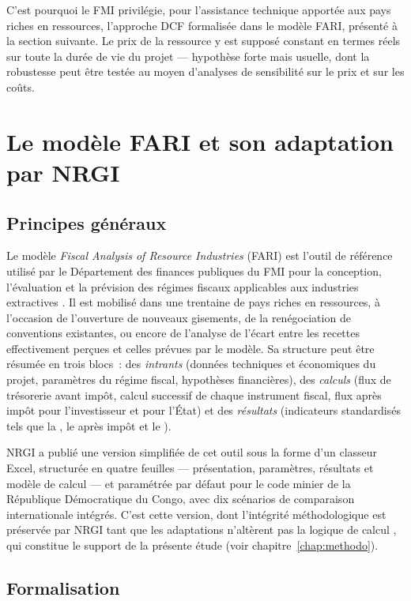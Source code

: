 C'est pourquoi le FMI privilégie, pour l'assistance technique apportée aux pays riches en ressources, l'approche DCF formalisée dans le modèle FARI, présenté à la section suivante. Le prix de la ressource y est supposé constant en termes réels sur toute la durée de vie du projet --- hypothèse forte mais usuelle, dont la robustesse peut être testée au moyen d'analyses de sensibilité sur le prix et sur les coûts.

\section{Le modèle FARI et son adaptation par NRGI}
\label{sec:fari}

\subsection{Principes généraux}

Le modèle \emph{Fiscal Analysis of Resource Industries} (FARI) est l'outil de référence utilisé par le Département des finances publiques du FMI pour la conception, l'évaluation et la prévision des régimes fiscaux applicables aux industries extractives \citep{luca2016fari}. Il est mobilisé dans une trentaine de pays riches en ressources, à l'occasion de l'ouverture de nouveaux gisements, de la renégociation de conventions existantes, ou encore de l'analyse de l'écart entre les recettes effectivement perçues et celles prévues par le modèle. Sa structure peut être résumée en trois blocs~: des \emph{intrants} (données techniques et économiques du projet, paramètres du régime fiscal, hypothèses financières), des \emph{calculs} (flux de trésorerie avant impôt, calcul successif de chaque instrument fiscal, flux après impôt pour l'investisseur et pour l'État) et des \emph{résultats} (indicateurs standardisés tels que la \VAN, le \TRI après impôt et le \TEMI).

NRGI a publié une version simplifiée de cet outil sous la forme d'un classeur Excel, structurée en quatre feuilles --- présentation, paramètres, résultats et modèle de calcul --- et paramétrée par défaut pour le code minier de la République Démocratique du Congo, avec dix scénarios de comparaison internationale intégrés. C'est cette version, dont l'intégrité méthodologique est préservée par NRGI tant que les adaptations n'altèrent pas la logique de calcul \citep{nrgi_excel_or}, qui constitue le support de la présente étude (voir chapitre~\ref{chap:methodo}).

\subsection{Formalisation}

